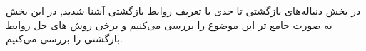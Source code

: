 در بخش دنباله‌های بازگشتی تا حدی با تعریف روابط بازگشتی آشنا شدید, در این بخش به صورت جامع تر این موضوع را بررسی می‌کنیم و برخی روش های حل روابط بازگشتی را بررسی می‌کنیم.


%
